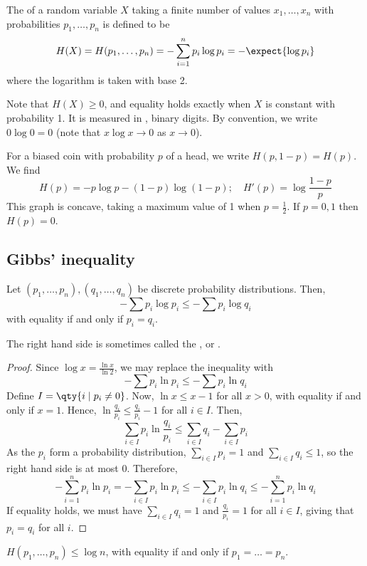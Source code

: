 \begin{definition}[Entropy]
    The  of a random variable $X$ taking a finite number of values $x_1, \dots, x_n$ with probabilities $p_1, \dots, p_n$ is defined to be
    \[ H(X) = H(p_1, \dots, p_n) = -\sum_{i=1}^n p_i \log p_i = -\expect{\log p_i} \]
    where the logarithm is taken with base 2.
\end{definition}

Note that $H(X) \geq 0$, and equality holds exactly when $X$ is constant with probability 1.
It is measured in , binary digits.
By convention, we write $0 \log 0 = 0$ (note that $x \log x \to 0$ as $x \to 0$).

\begin{example}
    For a biased coin with probability $p$ of a head, we write $H(p,1-p) = H(p)$.
    We find
    \[ H(p) = -p\log p - (1-p)\log(1-p);\quad H'(p) = \log \frac{1-p}{p} \]
    This graph is concave, taking a maximum value of 1 when $p = \frac{1}{2}$.
    If $p = 0, 1$ then $H(p) = 0$.
\end{example}

\subsection{Gibbs' inequality}
\begin{proposition}
    Let $(p_1, \dots, p_n), (q_1, \dots, q_n)$ be discrete probability distributions.
    Then,
    \[ -\sum p_i \log p_i \leq -\sum p_i \log q_i \]
    with equality if and only if $p_i = q_i$.
\end{proposition}
The right hand side is sometimes called the , or .
\begin{proof}
    Since $\log x = \frac{\ln x}{\ln 2}$, we may replace the inequality with
    \[ -\sum p_i \ln p_i \leq -\sum p_i \ln q_i \]
    Define $I = \qty{i \mid p_i \neq 0}$.
    Now, $\ln x \leq x - 1$ for all $x > 0$, with equality if and only if $x = 1$.
    Hence, $\ln \frac{q_i}{p_i} \leq \frac{q_i}{p_i} - 1$ for all $i \in I$.
    Then,
    \[ \sum_{i \in I} p_i \ln \frac{q_i}{p_i} \leq \sum_{i \in I} q_i - \sum_{i \in I} p_i \]
    As the $p_i$ form a probability distribution, $\sum_{i \in I} p_i = 1$ and $\sum_{i \in I} q_i \leq 1$, so the right hand side is at most 0.
    Therefore,
    \[ -\sum_{i=1}^n p_i \ln p_i = -\sum_{i \in I} p_i \ln p_i \leq -\sum_{i \in I} p_i \ln q_i \leq -\sum_{i=1}^n p_i \ln q_i \]
    If equality holds, we must have $\sum_{i \in I} q_i = 1$ and $\frac{q_i}{p_i} = 1$ for all $i \in I$, giving that $p_i = q_i$ for all $i$.
\end{proof}
\begin{corollary}
    $H(p_1, \dots, p_n) \leq \log n$, with equality if and only if $p_1 = \dots = p_n$.
\end{corollary}

